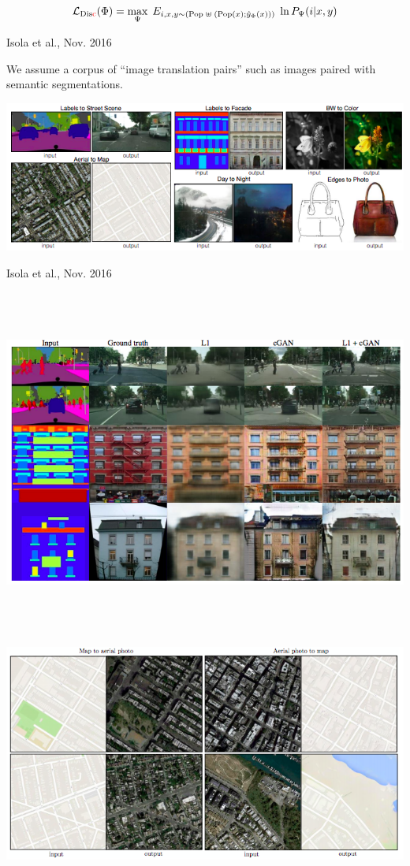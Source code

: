 {$${\cal L}_{\mathrm{Dis{\color{red}c}}}(\Phi) = \max_\Psi \;E_{i,x,y \sim (\mathrm{Pop}\; \uplus \;(\mathrm{Pop}(x);\hat{y}_\Phi(x)))}\;\ln P_\Psi(i|x,y)$$

{Isola et al., Nov. 2016}

We assume a corpus of ``image translation pairs'' such as images paired with semantic segmentations.

\centerline{\includegraphics[width = 8.0in]{../images/cGAN0}}

{Isola et al., Nov. 2016}

\centerline{\includegraphics[height = 4.5in]{../images/cGAN1}}


\centerline{\includegraphics[width = 8.0in]{../images/cGAN2}}

}
